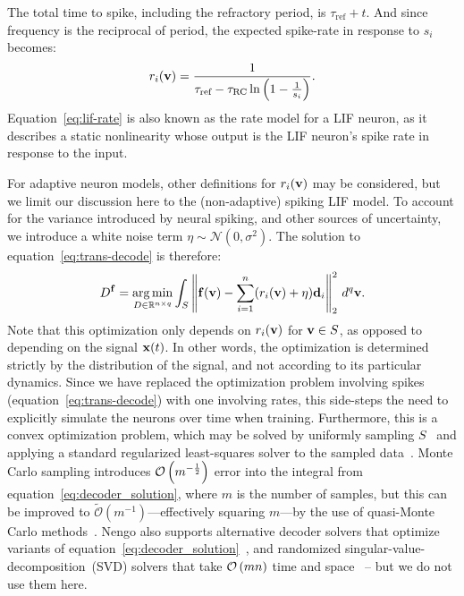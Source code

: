 The total time to spike, including the refractory period, is $\tau_\text{ref} + t$. And since frequency is the reciprocal of period, the expected spike-rate in response to $s_i$ becomes:
\begin{equation} \label{eq:lif-rate}
r_i(\mathbf{v}) = \frac{1}{\tau_\text{ref} -\tau_\text{RC} \ln \left( 1 - \frac{1}{s_i} \right)} \text{.}
\end{equation}
Equation~\ref{eq:lif-rate} is also known as the rate model for a LIF neuron, as it describes a static nonlinearity whose output is the LIF neuron's spike rate in response to the input.

For adaptive neuron models, other definitions for $r_i(\mathbf{v})$ may be considered, but we limit our discussion here to the (non-adaptive) spiking LIF model.
To account for the variance introduced by neural spiking, and other sources of uncertainty, we introduce a white noise term $\eta \sim \mathcal{N}(0, \sigma^2)$.
The solution to equation~\ref{eq:trans-decode} is therefore:
\begin{equation} \label{eq:decoder_solution}
D^{\mathbf{f}} = \operatorname*{arg\,min}_{D \in \mathbb{R}^{n \times q}} \int_{S} \left\| \mathbf{f}(\mathbf{v}) - \sum_{i=1}^n (r_i(\mathbf{v}) + \eta) \mathbf{d}_i \right\|_2^2 \, d^q\mathbf{v} \text{.}
\end{equation}
Note that this optimization only depends on $r_i(\mathbf{v})$ for $\mathbf{v} \in S$, as opposed to depending on the signal $\mathbf{x}(t)$.
In other words, the optimization is determined strictly by the distribution of the signal, and not according to its particular dynamics.
Since we have replaced the optimization problem involving spikes (equation~\ref{eq:trans-decode}) with one involving rates, this side-steps the need to explicitly simulate the neurons over time when training.
Furthermore, this is a convex optimization problem, which may be solved by uniformly sampling $S$~\citep{voelker2017} and applying a standard regularized least-squares solver to the sampled data~\citep{bekolay2014}.
Monte Carlo sampling introduces $\mathcal{O}\left({ m^{-\frac{1}{2}} }\right)$ error into the integral from equation~\ref{eq:decoder_solution}, where $m$ is the number of samples, but this can be improved to $\widetilde{\mathcal{O}} \left( m^{-1} \right)$---effectively squaring $m$---by the use of quasi-Monte Carlo methods~\citep{fang1994, knight2016}.
Nengo also supports alternative decoder solvers that optimize variants of equation~\ref{eq:decoder_solution}~\citep[e.g.,][]{voelker2016a, abrams2017}, and randomized singular-value-decomposition~(SVD) solvers that take $\mathcal{O}\left({mn}\right)$ time and space~\citep{halko2011finding} -- but we do not use them here.

